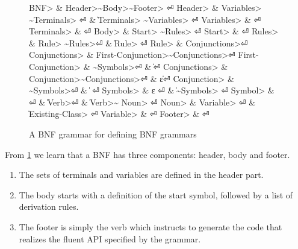 \begin{figure}
  \begin{Grammar}
    \begin{aligned}
      \<BNF>                & \Derives \<Header>\~\<Body>\~\<Footer> \hfill⏎
      \<Header>             & \Derives \<Variables> \~\<Terminals> \hfill⏎
      {}                    & \| \<Terminals> \~\<Variables> \hfill⏎
      \<Variables>          & \Derives {}\hfill⏎
      \<Terminals>          & \Derives {}\hfill⏎
      \<Body>               & \Derives \<Start> \~\<Rules> \hfill⏎
      \<Start>              & \Derives {} \hfill⏎
      \<Rules>              & \Derives \<Rule> \~\<Rules>\hfill⏎
      {}                    & \| \<Rule> \hfill⏎
      \<Rule>               & \Derives {} \<Conjunctions>\hfill⏎
      \<Conjunctions>       & \Derives \<First-Conjunction>\~\<Conjunctions>\hfill⏎
      \<First-Conjunction>  & \Derives {}\~\<Symbols>\hfill⏎
      {}                    & \| \hfill⏎
      \<Conjunctions> & \Derives \<Conjunction>\~\<Conjunctions>\hfill⏎
      {}                    & \| ε\hfill⏎
      \<Conjunction>  & \Derives {}\~\<Symbols>\hfill⏎
      {}                    & \|  \hfill⏎
      \<Symbols>    & \Derives ε \hfill⏎
      {}                    & \| \~\<Symbols> \hfill⏎
      \<Symbol>             & \Derives {} \hfill⏎
      {}                    & \| \<Verb>\hfill⏎
      {}                    & \| \<Verb>\~\cc{,} \<Noun> \hfill⏎
      \<Noun>               & \Derives \<Variable> \hfill⏎
      {}                    & \| \<Existing-Class> \hfill⏎
      \<Variable>           & \Derives {} \hfill⏎
      \<Footer>             & \Derives {}\hfill⏎
    \end{aligned}
  \end{Grammar}
  \caption{A BNF grammar for defining BNF grammars}
  \label{figure:BNF:BNF}
\end{figure}
\begin{comment}
Note that this specification can only be approximate;
the figure uses verbs as replacement to indentation,
and special symbols such as~$|$,~$::-$ and~$ε$.
\end{comment}

From \cref{figure:BNF:BNF} we learn
that a BNF has three components: header, body and footer.
\begin{enumerate}
  \item The sets of terminals and variables are defined in the header part.
  \item The body starts with a definition of the start symbol, followed by a list of derivation
        rules.
  \item The footer is simply the verb  which instructs \Fajita
        to generate the code that realizes the fluent API specified by the grammar.
\end{enumerate}

